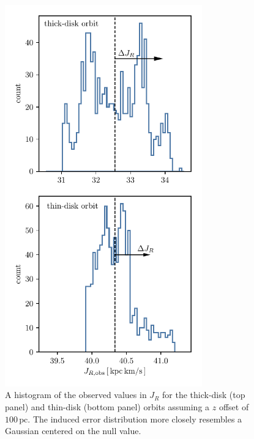 \documentclass[twocolumn]{aastex62}
\newcommand{\pc}{\text{pc}}
\begin{document}
\begin{figure}
\begin{center}
\includegraphics[width=3.35224200913in]{fig/schmactions_JR_zerr_hist.pdf}
\end{center}
\caption{A histogram of the observed values in $J_R$ for the thick-disk (top
panel) and thin-disk (bottom panel) orbits assuming a $z$ offset of
$100\,\pc$. The induced error distribution more closely resembles a Gaussian
centered on the null value.}
\label{fig:JR_zerr_hist}
\end{figure}
\end{document}
